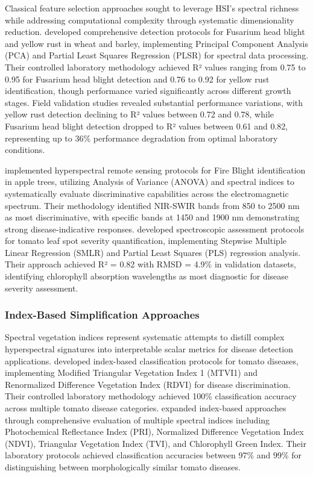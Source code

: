 \documentclass[sn-mathphys]{sn-jnl}
\theoremstyle{thmstyleone}%
\theoremstyle{thmstyletwo}%
\theoremstyle{thmstylethree}%
\begin{document}
Classical feature selection approaches sought to leverage HSI's spectral richness while addressing computational complexity through systematic dimensionality reduction. \citet{whetton2018hyperspectralP1} developed comprehensive detection protocols for Fusarium head blight and yellow rust in wheat and barley, implementing Principal Component Analysis (PCA) and Partial Least Squares Regression (PLSR) for spectral data processing. Their controlled laboratory methodology achieved R² values ranging from 0.75 to 0.95 for Fusarium head blight detection and 0.76 to 0.92 for yellow rust identification, though performance varied significantly across different growth stages. Field validation studies \citep{whetton2018hyperspectralP2} revealed substantial performance variations, with yellow rust detection declining to R² values between 0.72 and 0.78, while Fusarium head blight detection dropped to R² values between 0.61 and 0.82, representing up to 36\% performance degradation from optimal laboratory conditions. 


\citet{skoneczny2020fire} implemented hyperspectral remote sensing protocols for Fire Blight identification in apple trees, utilizing Analysis of Variance (ANOVA) and spectral indices to systematically evaluate discriminative capabilities across the electromagnetic spectrum. Their methodology identified NIR-SWIR bands from 850 to 2500 nm as most discriminative, with specific bands at 1450 and 1900 nm demonstrating strong disease-indicative responses. \citet{jones2010diagnosis} developed spectroscopic assessment protocols for tomato leaf spot severity quantification, implementing Stepwise Multiple Linear Regression (SMLR) and Partial Least Squares (PLS) regression analysis. Their approach achieved R² = 0.82 with RMSD = 4.9\% in validation datasets, identifying chlorophyll absorption wavelengths as most diagnostic for disease severity assessment.


\subsubsection{Index-Based Simplification Approaches}

Spectral vegetation indices represent systematic attempts to distill complex hyperspectral signatures into interpretable scalar metrics for disease detection applications. \citet{abdulridha2020laboratory} developed index-based classification protocols for tomato diseases, implementing Modified Triangular Vegetation Index 1 (MTVI1) and Renormalized Difference Vegetation Index (RDVI) for disease discrimination. Their controlled laboratory methodology achieved 100\% classification accuracy across multiple tomato disease categories. \citet{abdulridha2020detection} expanded index-based approaches through comprehensive evaluation of multiple spectral indices including Photochemical Reflectance Index (PRI), Normalized Difference Vegetation Index (NDVI), Triangular Vegetation Index (TVI), and Chlorophyll Green Index. Their laboratory protocols achieved classification accuracies between 97\% and 99\% for distinguishing between morphologically similar tomato diseases.
\end{document}
